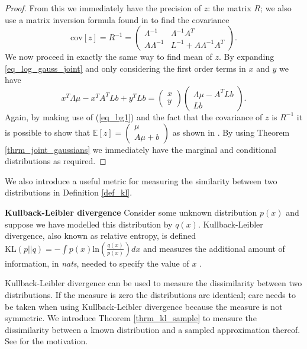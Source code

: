\begin{proof}
From this we immediately have the precision of $z$: the matrix $R$; we also use a matrix inversion formula found in \cite{bishop} to find the covariance
\begin{equation}
\text{cov}[z] = R^{-1} = \begin{pmatrix}
\Lambda^{-1} & \Lambda^{-1}A^T \\ A\Lambda^{-1} & L^{-1}+A\Lambda^{-1}A^T
\end{pmatrix}.
\label{eq_gauss_covar}
\end{equation}
We now proceed in exactly the same way to find mean of $z$. By expanding \ref{eq_log_gauss_joint} and only considering the first order terms in $x$ and $y$ we have
\begin{equation}
x^T\Lambda\mu-x^TA^TLb+y^TLb = \begin{pmatrix}
x \\ y
\end{pmatrix}\begin{pmatrix}
\Lambda\mu - A^TLb \\Lb
\end{pmatrix}.
\label{eq_gauss_mean1}
\end{equation}
Again, by making use of (\ref{eq_bg1}) and the fact that the covariance of $z$ is $R^{-1}$ it is possible to show that $\mathbb{E}[z]=\begin{pmatrix}
\mu \\ A\mu +b
\end{pmatrix}$ as shown in \cite{bishop}. By using Theorem \ref{thrm_joint_gaussians} we immediately have the marginal and conditional distributions as required.
\end{proof}
We also introduce a useful metric for measuring the similarity between two distributions in Definition \ref{def_kl}. 
\begin{defn}
\textbf{Kullback-Leibler divergence} Consider some unknown distribution $p(x)$ and suppose we have modelled this distribution by $q(x)$. Kullback-Leibler divergence, also known as relative entropy, is defined $\text{KL}(p||q) = -\int p(x)\text{ln}\left(\frac{q(x)}{p(x)}\right)dx$ and measures the additional amount of information, in \emph{nats}, needed to specify the value of $x$ \cite{bishop}. 
\label{def_kl}
\end{defn}
Kullback-Leibler divergence can be used to measure the dissimilarity between two distributions. If the measure is zero the distributions are identical; care needs to be taken when using Kullback-Leibler divergence because the measure is not symmetric. We introduce Theorem \ref{thrm_kl_sample} to measure the dissimilarity between a known distribution and a sampled approximation thereof. See \cite{bishop} for the motivation.
